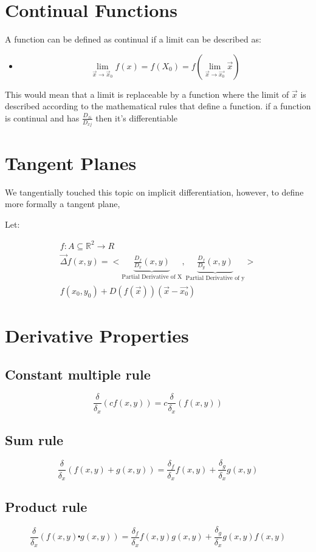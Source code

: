 \documentclass[11pt,fleqn]{book} %
\begin{document}
\section{Continual Functions}

A function can be defined as continual if a limit can be described as:

\begin{itemize}
    \item $$\lim_{\vec{x} \to \vec{x}_0}f(x) = f(X_0) = f(\lim_{\vec{x} \to \vec{x_0}} \vec{x})$$
\end{itemize}

This would mean that a limit is replaceable by a function where the limit of $\vec{x}$ 
is described according to the mathematical rules that define a function. 
if a function is continual and has $\frac{D_{fi}}{D_{xj}}$ then it's differentiable


\section{Tangent Planes}
 We tangentially touched this topic on implicit differentiation, however, to define more 
 formally a tangent plane,
 
 Let:

 \begin{gather}
    f: A \subseteq \mathbb{R}^2 \to R \\
    \vec{\Delta} f (x,y) = < \underbrace{\frac{D_f}{D_x} (x,y)}_\text{Partial Derivative of X}, \underbrace{\frac{D_f}{D_y} (x,y)}_\text{Partial Derivative of y}> \\
    f(x_0, y_0) + D(f(\vec{x})) (\vec{x}-\vec{x_0})
 \end{gather}


\section{Derivative Properties}
\subsection{Constant multiple rule}
$$ \frac{\delta}{\delta_x}(c f(x,y)) = c \frac{\delta}{\delta_x}(f(x,y)) $$
\subsection{Sum rule}
$$\frac{\delta}{\delta_x}(f(x,y) + g(x,y)) = \frac{\delta_f}{\delta_x} f(x,y) + \frac{\delta_g}{\delta_x} g(x,y)$$
\subsection{Product rule}
$$\frac{\delta}{\delta_x}(f(x,y) \centerdot g(x,y)) = \frac{\delta_f}{\delta_x} f(x,y) g(x,y) + \frac{\delta_g}{\delta_x} g(x,y) f(x,y)$$
\end{document}
